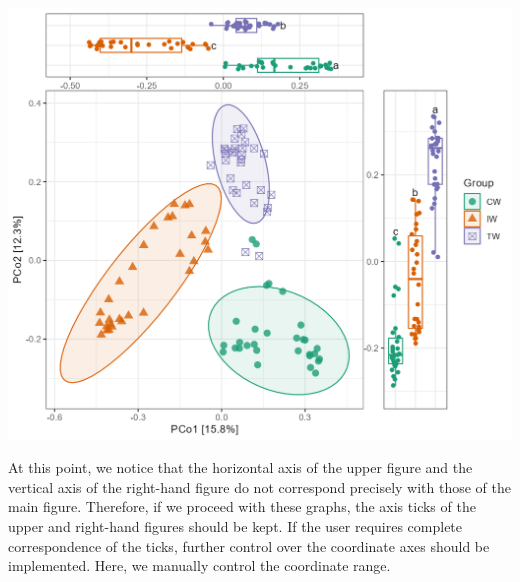 \documentclass[
]{book}
\begin{document}
\begin{center}\includegraphics[width=650px]{Images/Other_PCoA_boxplot1} \end{center}

At this point,
we notice that the horizontal axis of the upper figure and the vertical axis of the right-hand figure do not correspond precisely with those of the main figure.
Therefore, if we proceed with these graphs,
the axis ticks of the upper and right-hand figures should be kept.
If the user requires complete correspondence of the ticks,
further control over the coordinate axes should be implemented.
Here, we manually control the coordinate range.
\end{document}
